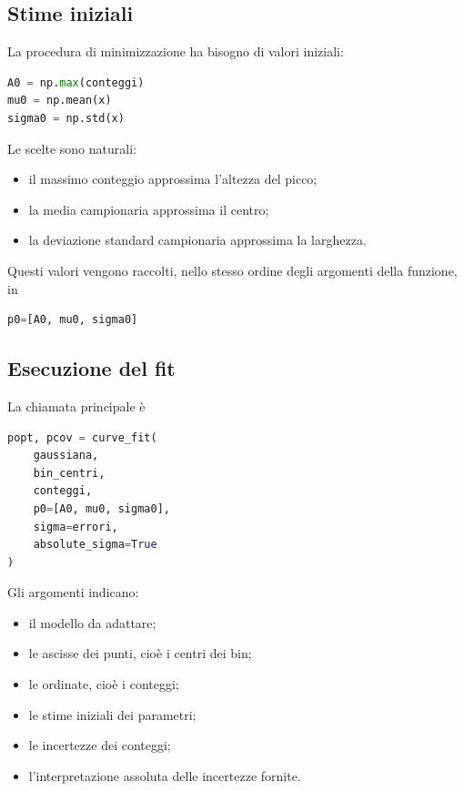 \documentclass[11pt,a4paper]{book}
\begin{document}
\subsection{Stime iniziali}

La procedura di minimizzazione ha bisogno di valori iniziali:

\begin{lstlisting}[language=Python]
A0 = np.max(conteggi)
mu0 = np.mean(x)
sigma0 = np.std(x)
\end{lstlisting}

Le scelte sono naturali:

\begin{itemize}
    \item il massimo conteggio approssima l'altezza del picco;
    \item la media campionaria approssima il centro;
    \item la deviazione standard campionaria approssima la larghezza.
\end{itemize}

Questi valori vengono raccolti, nello stesso ordine degli argomenti della
funzione, in

\begin{lstlisting}[language=Python]
p0=[A0, mu0, sigma0]
\end{lstlisting}

\subsection{Esecuzione del fit}

La chiamata principale è

\begin{lstlisting}[language=Python]
popt, pcov = curve_fit(
    gaussiana,
    bin_centri,
    conteggi,
    p0=[A0, mu0, sigma0],
    sigma=errori,
    absolute_sigma=True
)
\end{lstlisting}

Gli argomenti indicano:

\begin{itemize}
    \item il modello da adattare;
    \item le ascisse dei punti, cioè i centri dei bin;
    \item le ordinate, cioè i conteggi;
    \item le stime iniziali dei parametri;
    \item le incertezze dei conteggi;
    \item l'interpretazione assoluta delle incertezze fornite.
\end{itemize}
\end{document}
